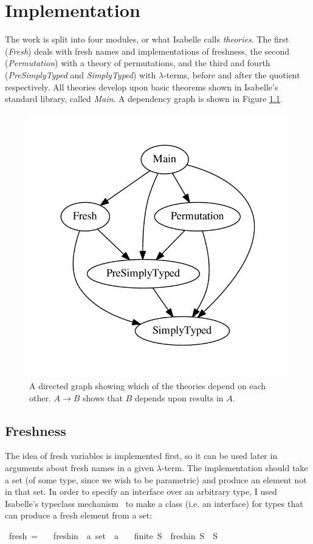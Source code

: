 \chapter{Implementation}
The work is split into four modules, or what Isabelle calls \emph{theories}.
The first (\emph{Fresh}) deals with fresh names and implementations of freshness, the second (\emph{Permutation}) with a theory of permutations, and the third and fourth (\emph{PreSimplyTyped} and \emph{SimplyTyped}) with \(\lambda\)-terms, before and after the quotient respectively.
All theories develop upon basic theorems shown in Isabelle's standard library, called \emph{Main}.
A dependency graph is shown in Figure \ref{fig:dependencies}.

\begin{figure}
\centering
\includegraphics[width=.5\textwidth]{chapters/implementation/figures/dependencies}
\caption{A directed graph showing which of the theories depend on each other. \(A \to B\) shows that \(B\) depends upon results in \(A\).}
\label{fig:dependencies}
\end{figure}

\section{Freshness}
The idea of fresh variables is implemented first, so it can be used later in arguments about fresh names in a given \(\lambda\)-term.
The implementation should take a set (of some type, since we wish to be parametric) and produce an element not in that set.
In order to specify an interface over an arbitrary type, I used Isabelle's typeclass mechanism~\cite{isabelle} to make a class (i.e. an interface) for types that can produce a fresh element from a set:

\begin{implementation}
\isamarkupfalse%
\ fresh\ =\isanewline
\ \ \ fresh{\isacharunderscore}in\ {\isacharcolon}{\isacharcolon}\ {\isachardoublequoteopen}{\isacharprime}a\ set\ {\isasymRightarrow}\ {\isacharprime}a{\isachardoublequoteclose}\isanewline
\ \ \ {\isachardoublequoteopen}finite\ S\ {\isasymLongrightarrow}\ fresh{\isacharunderscore}in\ S\ {\isasymnotin}\ S{\isachardoublequoteclose}\isanewline
\end{implementation}

